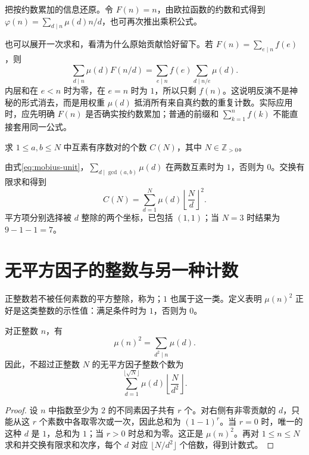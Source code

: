 \documentclass[UTF8,12pt,a4paper,fontset=fandol]{ctexbook}
\begin{document}
把按约数累加的信息还原。令 $F(n)=n$，由欧拉函数的约数和式得到 $\varphi(n)=\sum_{d\mid n}\mu(d)n/d$，也可再次推出乘积公式。

也可以展开一次求和，看清为什么原始贡献恰好留下。若 $F(n)=\sum_{e\mid n}f(e)$，则
\[
 \sum_{d\mid n}\mu(d)F(n/d)
 =\sum_{e\mid n}f(e)\sum_{d\mid n/e}\mu(d).
\]
内层和在 $e<n$ 时为零，在 $e=n$ 时为 $1$，所以只剩 $f(n)$。这说明反演不是神秘的形式消去，而是用权重 $\mu(d)$ 抵消所有来自真约数的重复计数。实际应用时，应先明确 $F(n)$ 是否确实按约数累加；普通的前缀和 $\sum_{k=1}^n f(k)$ 不能直接套用同一公式。

\begin{example}
求 $1\le a,b\le N$ 中互素有序数对的个数 $C(N)$，其中 $N\in\mathbb Z_{>0}$。
\end{example}
\begin{solve}
由式\eqref{eq:mobius-unit}，$\sum_{d\mid\gcd(a,b)}\mu(d)$ 在两数互素时为 $1$，否则为 $0$。交换有限求和得到
\begin{equation}
 C(N)=\sum_{d=1}^N\mu(d)\left\lfloor\frac Nd\right\rfloor^2.
 \label{eq:coprime-pairs}
\end{equation}
平方项分别选择被 $d$ 整除的两个坐标，已包括 $(1,1)$；当 $N=3$ 时结果为 $9-1-1=7$。
\end{solve}

\section{无平方因子的整数与另一种计数}

正整数若不被任何素数的平方整除，称为；$1$ 也属于这一类。定义表明 $\mu(n)^2$ 正好是这类整数的示性值：满足条件时为 $1$，否则为 $0$。

\begin{proposition}
\label{prop:squarefree-count}
对正整数 $n$，有
\[
 \mu(n)^2=\sum_{d^2\mid n}\mu(d).
\]
因此，不超过正整数 $N$ 的无平方因子整数个数为
\[
 \sum_{d=1}^{\lfloor\sqrt N\rfloor}\mu(d)
 \left\lfloor\frac{N}{d^2}\right\rfloor.
\]
\end{proposition}
\begin{proof}
设 $n$ 中指数至少为 $2$ 的不同素因子共有 $r$ 个。对右侧有非零贡献的 $d$，只能从这 $r$ 个素数中各取零次或一次，因此总和为 $(1-1)^r$。当 $r=0$ 时，唯一的这种 $d$ 是 $1$，总和为 $1$；当 $r>0$ 时总和为零。这正是 $\mu(n)^2$。再对 $1\le n\le N$ 求和并交换有限求和次序，每个 $d$ 对应 $\lfloor N/d^2\rfloor$ 个倍数，得到计数式。
\end{proof}
\end{document}
